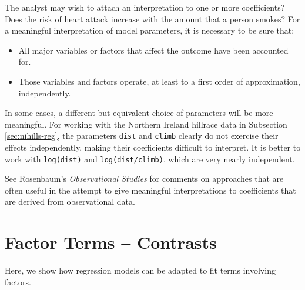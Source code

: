 The analyst may wish to attach an interpretation to one or more
coefficients?  Does the risk of heart attack increase with the amount
that a person smokes?  For a meaningful interpretation of model
parameters, it is necessary to be sure that:
\begin{itemize}
\item All major variables or factors that affect the outcome have been
  accounted for.
\item Those variables and factors operate, at least to a first
order of approximation, independently.
\end{itemize}

In some cases, a different but equivalent choice of parameters will be
more meaningful.  For working with the Northern Ireland hillrace data
in Subsection \ref{sec:nihills-reg}, the parameters \texttt{dist} and
\texttt{climb} clearly do not exercise their effects independently,
making their coefficients difficult to interpret. It is better to work
with \texttt{log(dist)} and \texttt{log(dist/climb)}, which are very
nearly independent.

See Rosenbaum's {\em Observational Studies} for comments on approaches
that are often useful in the attempt to give meaningful
interpretations to coefficients that are derived from observational
data.

\section{Factor Terms -- Contrasts}\label{ss:facs}

Here, we show how regression models can
be adapted to fit terms involving factors.

